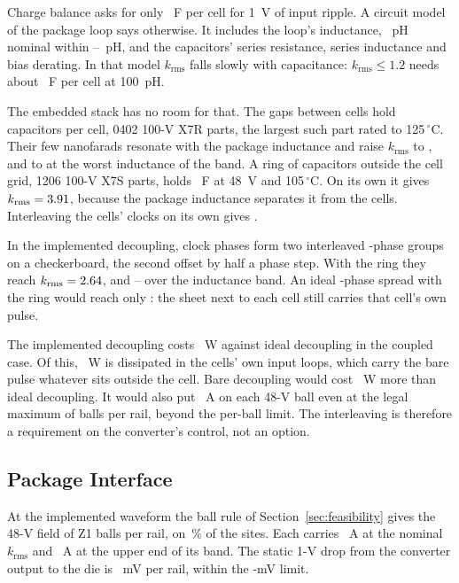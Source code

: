 Charge balance asks for only \WrCchargeOneV~\textmu F per cell for 1~V of input ripple. A circuit
model of the package loop says otherwise. It includes the loop's inductance, \WrLloop~pH nominal
within \WrLloopLo--\WrLloopHi~pH, and the capacitors' series resistance, series inductance and bias
derating. In that model $k_{\mathrm{rms}}$ falls slowly with capacitance: $k_{\mathrm{rms}} \le 1.2$
needs about \WrCkTwelve~\textmu F per cell at 100~pH.

The embedded stack has no room for that. The gaps between cells hold \WrGapCapsPerCell{} capacitors
per cell, 0402 100-V X7R parts, the largest such part rated to 125\,$^\circ$C. Their few nanofarads
resonate with the package inductance and raise $k_{\mathrm{rms}}$ to \WrKgap{}, and to \WrKgapHi{} at
the worst inductance of the band. A ring of \FrDecapN{} capacitors outside the cell grid, 1206 100-V
X7S parts, holds \FrDecapCtot~\textmu F at 48~V and 105\,$^\circ$C. On its own it gives
$k_{\mathrm{rms}} = 3.91$, because the package inductance separates it from the cells.
Interleaving the cells' clocks on its own gives \WrKinter.

In the implemented decoupling, \FrDecapPhases{} clock phases form two interleaved
\FrDecapGroupWord-phase groups on a checkerboard, the second offset by half a phase step. With the ring
they reach $k_{\mathrm{rms}} = 2.64$, and \WrKrmsLo--\WrKrmsHi{} over the inductance band. An ideal
\FrDseOptM-phase spread with the ring would reach only \WrKspread: the sheet next to each cell still
carries that cell's own pulse.

The implemented decoupling costs \WrDecapCoupledA~W against ideal decoupling in the coupled case.
Of this, \WrHotLoop~W is dissipated in the cells' own input loops, which carry the bare pulse
whatever sits outside the cell. Bare decoupling would cost \RiseSoneZone~W more than ideal
decoupling. It would also put \WrBgaBareAtNmaxZone~A on each 48-V ball even at the legal maximum of
\WrBgaNmax{} balls per rail, beyond the per-ball limit. The interleaving is therefore a requirement
on the converter's control, not an option.

\subsection{Package Interface}\label{sec:evaluate-bga}
At the implemented waveform the ball rule of Section~\ref{sec:feasibility} gives the 48-V field
of Z1 \WrBgaNZone{} balls per rail, on \WrBgaFracZone\,\% of the \MthSitesFull{} sites. Each
carries \WrBgaIZone~A at the nominal $k_{\mathrm{rms}}$ and \WrBgaIhiZone~A at the upper end of its
band. The static 1-V drop from the converter output to the die is
\VdropAZone~mV per rail, within the \MthLimDrop-mV limit.

